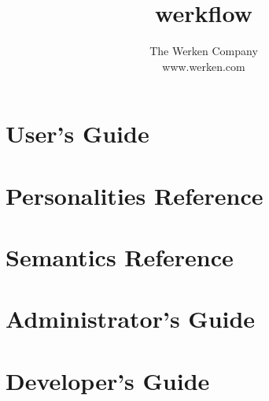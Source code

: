 \documentclass[10pt,letterpaper]{book}
\newcommand{\werkflow}{{\textsf{werkflow}}}
\begin{document}
\let\footnoterule\hrule

\makeatletter
\renewcommand{\@makefntext}[1]%
        {\noindent\makebox[1.8em][r]{\@makefnmark}#1}
\makeatother

\title{\werkflow}

\author{\textsf{The Werken Company}\\
        \textsf{www.werken.com}}


\frontmatter

\maketitle

\tableofcontents

\mainmatter

\part{User's Guide}





\part{Personalities Reference}





\part{Semantics Reference}







\part{Administrator's Guide}




\part{Developer's Guide}





\end{document}

